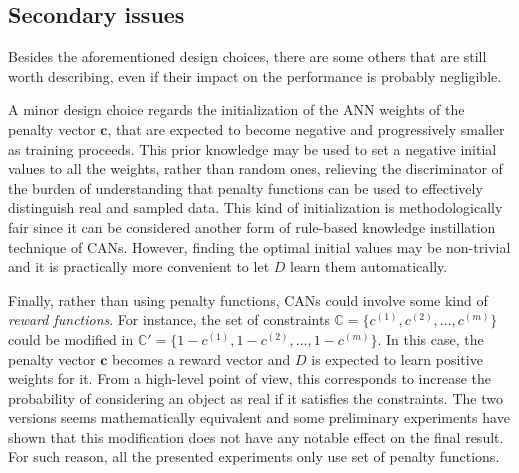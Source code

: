 \subsection{Secondary issues}

Besides the aforementioned design choices, there are some others that are still worth describing, even if their impact on the performance is probably negligible.

A minor design choice regards the initialization of the ANN weights of the penalty vector $\bm{c}$, that are expected to become negative and progressively smaller as training proceeds. This prior knowledge may be used to set a negative initial values to all the weights, rather than random ones, relieving the discriminator of the burden of understanding that penalty functions can be used to effectively distinguish real and sampled data. This kind of initialization is methodologically fair since it can be considered another form of rule-based knowledge instillation technique of CANs. However, finding the optimal initial values may be non-trivial and it is practically more convenient to let $D$ learn them automatically.

Finally, rather than using penalty functions, CANs could involve some kind of \textit{reward functions}. For instance, the set of constraints $\mathbb{C} = \{c^{(1)}, c^{(2)}, ..., c^{(m)}\}$ could be modified in $\mathbb{C'} = \{1 - c^{(1)}, 1 - c^{(2)}, ..., 1 - c^{(m)}\}$. In this case, the penalty vector $\bm{c}$ becomes a reward vector and $D$ is expected to learn positive weights for it. From a high-level point of view, this corresponds to increase the probability of considering an object as real if it satisfies the constraints. The two versions seems mathematically equivalent and some preliminary experiments have shown that this modification does not have any notable effect on the final result. For such reason, all the presented experiments only use set of penalty functions.

